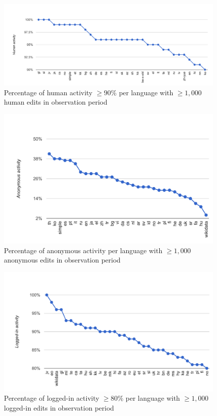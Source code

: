 \documentclass{sig-alternate}
\begin{document}
\begin{figure}[p]
  \center
  \includegraphics[width=\linewidth]{most-human-edited-languages.pdf}
  \caption{Percentage of human activity $\geq90\%$ per language with $\geq1,000$ human edits in observation period}
  \label{fig:most-human-edited-languages}
\end{figure}

\begin{figure}[p]
  \center
  \includegraphics[width=\linewidth]{most-anonymous-edited-languages.pdf}
  \caption{Percentage of anonymous activity per language with $\geq1,000$ anonymous edits in observation period}
  \label{fig:most-anonymous-edited-languages}
\end{figure}

\begin{figure}[p]
  \center
  \includegraphics[width=\linewidth]{most-logged-in-edited-languages.pdf}
  \caption{Percentage of logged-in activity $\geq80\%$ per language with $\geq1,000$ logged-in edits in observation period}
  \label{fig:most-logged-in-edited-languages}
\end{figure}
\end{document}
